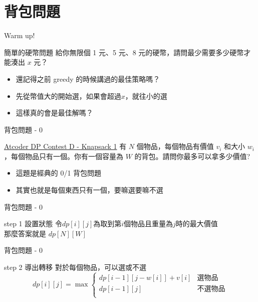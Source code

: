\documentclass[aspectratio=169]{beamer}
\begin{document}
    \section{背包問題}

    \begin{frame}{Warm up!}
        \begin{block}{簡單的硬幣問題}
        給你無限個 1 元、5 元、8 元的硬幣，請問最少需要多少硬幣才能湊出 $x$ 元？
        \end{block} 
        \begin{itemize}
            \item<2-> 還記得之前 greedy 的時候講過的最佳策略嗎？
            \item<3-> 先從幣值大的開始選，如果會超過$x$，就往小的選
            \item<4-> 這樣真的會是最佳解嗎？
        \end{itemize}
    \end{frame}

    \begin{frame}{背包問題 - 0}
        \begin{block}{\href{https://atcoder.jp/contests/dp/tasks/dp_d}{Atcoder DP Contest D - Knapsack 1}}
            有 $N$ 個物品，每個物品有價值 $v_i$ 和大小 $w_i$，每個物品只有一個。你有一個容量為 $W$ 的背包。請問你最多可以拿多少價值?
        \end{block}
        \begin{itemize}
            \item<2-> 這題是經典的 0/1 背包問題
            \item<2-> 其實也就是每個東西只有一個，要嘛選要嘛不選
        \end{itemize}
    \end{frame}

    \begin{frame}{背包問題 - 0}
        \begin{alertblock}{step 1 設置狀態}
            令$dp[i][j]$為取到第$i$個物品且重量為$j$時的最大價值\\
            \vspace{2mm}
            那麼答案就是 $dp[N][W]$
        \end{alertblock}
    \end{frame}

    \begin{frame}{背包問題 - 0}
        \begin{block}{step 2 導出轉移}
            對於每個物品，可以選或不選\\
            $$
            dp[i][j]= \max
            \begin{cases}
                dp[i-1][j-w[i]]+v[i] & \text{選物品} \\
                dp[i-1][j]           & \text{不選物品} \\
            \end{cases}
            $$
        \end{block}
    \end{frame}  
\end{document}

